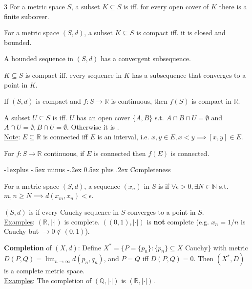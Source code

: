 \documentclass[10pt,landscape,letterpaper]{article}
\makeatletter
\renewcommand{\subsection}{\@startsection{subsection}{2}{0mm}%
                                {-1explus -.5ex minus -.2ex}%
                                {0.5ex plus .2ex}%
                                {\sffamily\normalsize\itshape}}
\makeatother
\begin{document}
\begin{multicols}{3}
For a metric space $S$, a subset $K \subseteq S$ is  iff. for every open cover of $K$ there is a finite subcover.


 For a metric space $(S, d)$, a subset $K \subseteq S$ is compact iff. it is closed and bounded.

 A bounded sequence in $(S, d)$ has a convergent subsequence.

 $K \subseteq S$ is compact iff. every sequence in $K$ has a subsequence that converges to a point in $K$.


 If $(S, d)$ is compact and $f: S \to \mathbb{R}$ is continuous, then $f(S)$ is compact in $\mathbb{R}$.


\smallbreak


A subset $U \subseteq S$ is  iff. $U$ has an open cover $\{ A, B\}$ s.t. $A \cap B \cap U = \emptyset$ and $A \cap U = \emptyset, B \cap U = \emptyset$. Otherwise it is .
\\
\underline{Note}: $E \subseteq \mathbb{R}$ is connected iff $E$ is an interval, i.e. $x, y \in E, x < y \implies [x, y] \in E$.


 For $f: S \to \mathbb{R}$ continuous, if $E$ is connected then $f(E)$ is connected.

\subsection{Completeness}

For a metric space $(S, d)$, a sequence $(x_n)$ in $S$ is  if
$\forall \epsilon > 0, \exists N \in \mathbb{N}$ s.t. $m, n \geq N \implies d(x_m, x_n) < \epsilon$.

$(S, d)$ is  if every Cauchy sequence in $S$ converges to a point in $S$.
\\
\underline{Examples}: $(\mathbb{R}, |\cdot|)$ is complete. $((0,1), |\cdot|)$ is \textbf{not} complete (e.g. $x_n = 1/n$ is Cauchy but $\to 0 \notin (0,1)$).

\smallbreak

\textbf{Completion} of $(X, d)$: Define $X^* = \{P = \{p_n\} : \{p_n\} \subseteq X \text{ Cauchy}\}$ with metric $D(P, Q) = \lim_{n \to \infty} d(p_n, q_n)$, and $P = Q$ iff $D(P,Q) = 0$.
Then $(X^*, D)$ is a complete metric space.
\\
\underline{Examples}: The completion of $(\mathbb{Q}, |\cdot|)$ is $(\mathbb{R}, |\cdot|)$.


\end{multicols}
\end{document}
